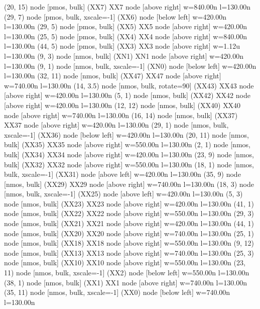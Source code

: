 \begin{circuitikz}[american]
	(20, 15) node [pmos, bulk] (XX7) {XX7} node [above right] {\tiny {w=840.00n l=130.00n}}
	(29, 7) node [pmos, bulk, xscale=-1] (XX6) {} node [below left] {\tiny {w=420.00n l=130.00n}}
	(29, 5) node [pmos, bulk] (XX5) {XX5} node [above right] {\tiny {w=420.00n l=130.00n}}
	(25, 5) node [pmos, bulk] (XX4) {XX4} node [above right] {\tiny {w=840.00n l=130.00n}}
	(44, 5) node [pmos, bulk] (XX3) {XX3} node [above right] {\tiny {w=1.12u l=130.00n}}
	(9, 3) node [nmos, bulk] (XN1) {XN1} node [above right] {\tiny {w=420.00n l=130.00n}}
	(9, 1) node [nmos, bulk, xscale=-1] (XN0) {} node [below left] {\tiny {w=420.00n l=130.00n}}
	(32, 11) node [nmos, bulk] (XX47) {XX47} node [above right] {\tiny {w=740.00n l=130.00n}}
	(14, 3.5) node [nmos, bulk, rotate=90] (XX43) {XX43} node [above right] {\tiny {w=420.00n l=130.00n}}
	(5, 1) node [nmos, bulk] (XX42) {XX42} node [above right] {\tiny {w=420.00n l=130.00n}}
	(12, 12) node [nmos, bulk] (XX40) {XX40} node [above right] {\tiny {w=740.00n l=130.00n}}
	(16, 14) node [nmos, bulk] (XX37) {XX37} node [above right] {\tiny {w=420.00n l=130.00n}}
	(29, 1) node [nmos, bulk, xscale=-1] (XX36) {} node [below left] {\tiny {w=420.00n l=130.00n}}
	(20, 11) node [nmos, bulk] (XX35) {XX35} node [above right] {\tiny {w=550.00n l=130.00n}}
	(2, 1) node [nmos, bulk] (XX34) {XX34} node [above right] {\tiny {w=420.00n l=130.00n}}
	(23, 9) node [nmos, bulk] (XX32) {XX32} node [above right] {\tiny {w=550.00n l=130.00n}}
	(18, 1) node [nmos, bulk, xscale=-1] (XX31) {} node [above left] {\tiny {w=420.00n l=130.00n}}
	(35, 9) node [nmos, bulk] (XX29) {XX29} node [above right] {\tiny {w=740.00n l=130.00n}}
	(18, 3) node [nmos, bulk, xscale=-1] (XX25) {} node [above left] {\tiny {w=420.00n l=130.00n}}
	(5, 3) node [nmos, bulk] (XX23) {XX23} node [above right] {\tiny {w=420.00n l=130.00n}}
	(41, 1) node [nmos, bulk] (XX22) {XX22} node [above right] {\tiny {w=550.00n l=130.00n}}
	(29, 3) node [nmos, bulk] (XX21) {XX21} node [above right] {\tiny {w=420.00n l=130.00n}}
	(44, 1) node [nmos, bulk] (XX20) {XX20} node [above right] {\tiny {w=740.00n l=130.00n}}
	(25, 1) node [nmos, bulk] (XX18) {XX18} node [above right] {\tiny {w=550.00n l=130.00n}}
	(9, 12) node [nmos, bulk] (XX13) {XX13} node [above right] {\tiny {w=740.00n l=130.00n}}
	(25, 3) node [nmos, bulk] (XX10) {XX10} node [above right] {\tiny {w=550.00n l=130.00n}}
	(23, 11) node [nmos, bulk, xscale=-1] (XX2) {} node [below left] {\tiny {w=550.00n l=130.00n}}
	(38, 1) node [nmos, bulk] (XX1) {XX1} node [above right] {\tiny {w=740.00n l=130.00n}}
	(35, 11) node [nmos, bulk, xscale=-1] (XX0) {} node [below left] {\tiny {w=740.00n l=130.00n}}


\end{circuitikz}
